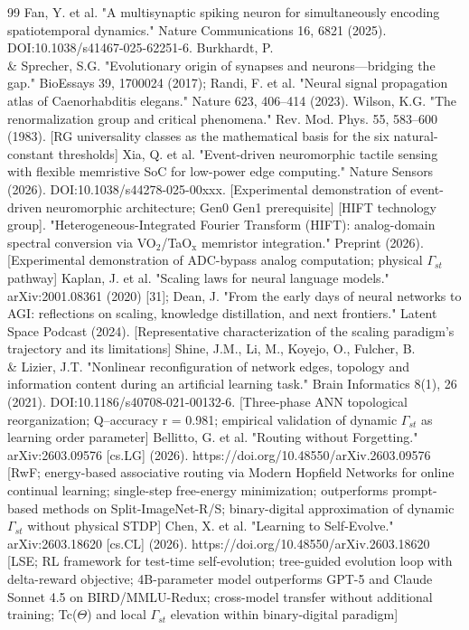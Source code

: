 \documentclass[a4paper,12pt]{article}
\providecommand{\textsubscript}[1]{\ensuremath{_{\text{#1}}}}
\begin{document}
\begin{thebibliography}{99}
 Fan, Y. et al. "A multisynaptic spiking neuron for simultaneously encoding spatiotemporal dynamics." Nature Communications 16, 6821 (2025). DOI:10.1038/s41467-025-62251-6.
 Burkhardt, P. \\& Sprecher, S.G. "Evolutionary origin of synapses and neurons---bridging the gap." BioEssays 39, 1700024 (2017); Randi, F. et al. "Neural signal propagation atlas of Caenorhabditis elegans." Nature 623, 406--414 (2023).
 Wilson, K.G. "The renormalization group and critical phenomena." Rev. Mod. Phys. 55, 583--600 (1983). [RG universality classes as the mathematical basis for the six natural-constant thresholds]
 Xia, Q. et al. "Event-driven neuromorphic tactile sensing with flexible memristive SoC for low-power edge computing." Nature Sensors (2026). DOI:10.1038/s44278-025-00xxx. [Experimental demonstration of event-driven neuromorphic architecture; Gen0 \rightarrow Gen1 prerequisite]
 [HIFT technology group]. "Heterogeneous-Integrated Fourier Transform (HIFT): analog-domain spectral conversion via VO\textsubscript{2}/TaO\textsubscript{x} memristor integration." Preprint (2026). [Experimental demonstration of ADC-bypass analog computation; physical $\Gamma_{st}$ pathway]
 Kaplan, J. et al. "Scaling laws for neural language models." arXiv:2001.08361 (2020) [31]; Dean, J. "From the early days of neural networks to AGI: reflections on scaling, knowledge distillation, and next frontiers." Latent Space Podcast (2024). [Representative characterization of the scaling paradigm's trajectory and its limitations]
 Shine, J.M., Li, M., Koyejo, O., Fulcher, B. \\& Lizier, J.T. "Nonlinear reconfiguration of network edges, topology and information content during an artificial learning task." Brain Informatics 8(1), 26 (2021). DOI:10.1186/s40708-021-00132-6. [Three-phase ANN topological reorganization; Q--accuracy r = 0.981; empirical validation of dynamic $\Gamma_{st}$ as learning order parameter]
 Bellitto, G. et al. "Routing without Forgetting." arXiv:2603.09576 [cs.LG] (2026). https://doi.org/10.48550/arXiv.2603.09576 [RwF; energy-based associative routing via Modern Hopfield Networks for online continual learning; single-step free-energy minimization; outperforms prompt-based methods on Split-ImageNet-R/S; binary-digital approximation of dynamic $\Gamma_{st}$ without physical STDP]
 Chen, X. et al. "Learning to Self-Evolve." arXiv:2603.18620 [cs.CL] (2026). https://doi.org/10.48550/arXiv.2603.18620 [LSE; RL framework for test-time self-evolution; tree-guided evolution loop with delta-reward objective; 4B-parameter model outperforms GPT-5 and Claude Sonnet 4.5 on BIRD/MMLU-Redux; cross-model transfer without additional training; Tc($\Theta$) and local $\Gamma_{st}$ elevation within binary-digital paradigm]

\end{thebibliography}
\end{document}

